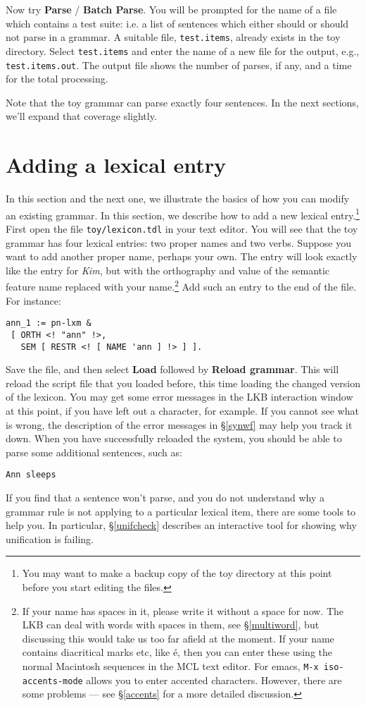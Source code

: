 \documentclass[12pt]{report}
\begin{document}
Now try {\bf Parse} / {\bf Batch Parse}.  You will be prompted for the
name of a file which contains a test suite: i.e. a list of sentences
which either should or should not parse in a grammar.  A suitable file,
{\tt test.items}, already exists in the toy directory.  Select 
{\tt test.items} and enter the name of a new file for the output,
e.g., {\tt test.items.out}.  The output file shows the number of parses, if
any, and a time for the total processing.

Note that the toy grammar can parse exactly four 
sentences.  In the next sections, we'll expand that coverage slightly.


\section{Adding a lexical entry}

In this section and the next one, we illustrate the basics of how you can
modify an existing grammar.
In this section, we describe how to add a new lexical entry.\footnote{You 
may want to make a backup copy of the toy
directory at this point before you start editing the files.}
First open the file {\tt toy/lexicon.tdl} in your text 
editor.
You will see that
the toy grammar has four lexical entries: two proper names and two verbs.
Suppose you want to add another proper name,
perhaps your own.  The entry will look exactly like
the entry for {\it Kim}, but with the orthography and value
of the semantic feature {\sc name} replaced with your name.\footnote{If your name
has spaces in it, please write it without a space for now.  
The LKB can deal with words with spaces in them, see \S\ref{multiword},
but discussing this would take us too far afield at the moment.  If your name contains
diacritical marks etc, like \'{e}, then you can enter these 
using the normal Macintosh sequences 
in the MCL text editor.  For emacs, {\tt M-x iso-accents-mode} allows
you to enter accented characters.  
However, there are some problems --- see \S\ref{accents} for a more
detailed discussion.}
Add such an entry to the end of the file.
For instance:
\begin{verbatim}
ann_1 := pn-lxm & 
 [ ORTH <! "ann" !>,
   SEM [ RESTR <! [ NAME 'ann ] !> ] ].
\end{verbatim}

Save the file, and then select {\bf Load}
followed by {\bf Reload grammar}.  This will reload the script file that
you loaded before, this time loading the changed version of the lexicon.
You may get some error messages in the LKB interaction window
at this point, if you have left
out a character, for example.  If you cannot see what is wrong, the
description of the error messages in \S\ref{synwf} may help you
track it down.  When you have successfully reloaded the system,
you should be able to parse some additional sentences, such as:
\begin{verbatim}
Ann sleeps
\end{verbatim}
If you find that a sentence won't parse, and you do not understand
why a grammar rule is not applying to a particular lexical
item, there are some tools to help you.  In particular,
\S\ref{unifcheck} describes an interactive tool for 
showing why unification is failing.
\end{document}
